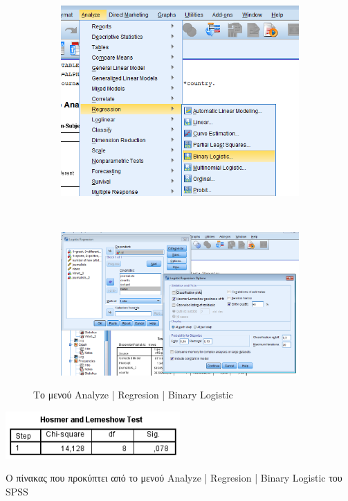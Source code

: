 \documentclass{assignment}
\begin{document}
\begin{Assignment}[Μέρος Ε]
\begin{figure}[htbp]
  \centering
  \begin{subfigure}[b]{0.5\textwidth}
     \includegraphics[width=\textwidth,height=0.25\textheight]{images/menu_binary.png}
  \end{subfigure}%
   ~ %
  \begin{subfigure}[b]{0.5\textwidth}
    \includegraphics[width=\textwidth,height=0.25\textheight]{images/binary.png}
  \end{subfigure}
  \caption{Το μενού Analyze | Regresion | Binary Logistic}
\label{fig:binary}
\end{figure}


\begin{table}[htbp]
\centering
\includegraphics[width=0.5\textwidth]{images/table_binary_hosmer.png}
\caption{Ο πίνακας που προκύπτει από το μενού Analyze | Regresion | Binary Logistic του SPSS }
\label{table:binary_hosmer}
\end{table}



\end{Assignment}
\end{document}
